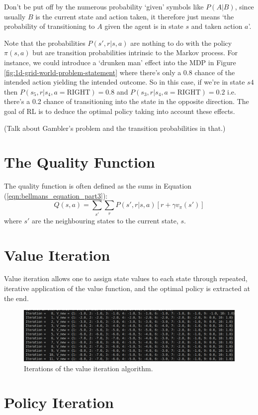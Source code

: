 \documentclass[a4paper,11pt]{article}
\begin{document}
Don't be put off by the numerous probability `given' symbols like $P(A|B)$, since usually $B$ is the current state and action taken, it therefore just means `the probability of transitioning to $A$ given the agent is in state $s$ and taken action $a$'.  

Note that the probabilities $P(s',r|s,a)$ are nothing to do with the policy $\pi(s,a)$ but are transition probabilities intrinsic to the Markov process.  For instance, we could introduce a `drunken man' effect into the MDP in Figure \ref{fig:1d-grid-world-problem-statement} where there's only a 0.8 chance of the intended action yielding the intended outcome.  So in this case, if we're in state $s4$ then $P(s_5,r|s_4, a=\text{RIGHT}) = 0.8$ and $P(s_3,r|s_4, a=\text{RIGHT}) = 0.2$ i.e. there's a 0.2 chance of transitioning into the state in the opposite direction.  The goal of RL is to deduce the optimal policy taking into account these effects.

(Talk about Gambler's problem and the transition probabilities in that.)



\section{The Quality Function}

The quality function is often defined as the sums in Equation (\ref{eqn:bellmans_equation_part3}):
\begin{equation} \label{eqn:quality_function_Q}
    Q(s,a) = \sum_{s'} \sum_r P(s',r|s,a) [r + \gamma v_{\pi}(s')]
\end{equation}
where $s'$ are the neighbouring states to the current state, $s$.  


\section{Value Iteration}

Value iteration allows one to assign state values to each state through repeated, iterative application of the value function, and the optimal policy is extracted at the end.  



\begin{figure}
    \includegraphics[width=\textwidth]{images/iters-of-value-iteration-1d-grid-world-code-output.png}
    \caption{Iterations of the value iteration algorithm.}
    \label{fig:iters-of-value-iteration-1d-grid-world-code-output}
\end{figure}


\section{Policy Iteration}
\end{document}

